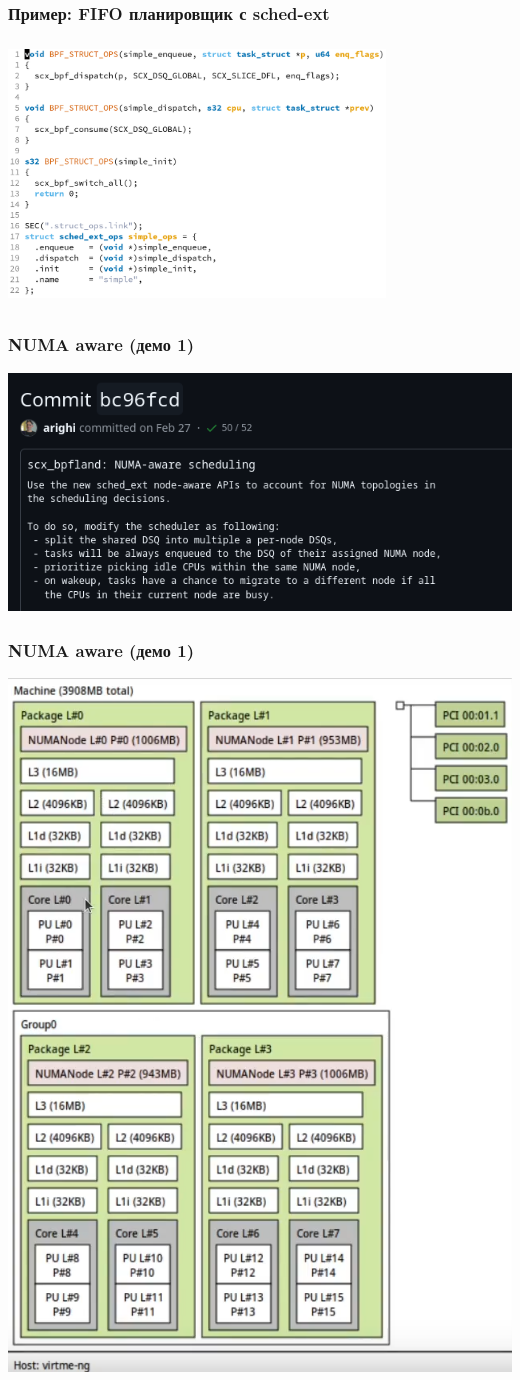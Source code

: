 \documentclass[aspectratio=169]{beamer}
\begin{document}
\begin{frame}
  \frametitle{Пример: FIFO планировщик с sched-ext}
  \includegraphics[width=10cm,height=7cm]{res/simple.png}
\end{frame}

\begin{frame}
  \frametitle{NUMA aware (демо 1)}
  \includegraphics[width=\linewidth]{res/D0_0.png}
\end{frame}

\begin{frame}
  \frametitle{NUMA aware (демо 1)}
  \vspace*{0.2cm}
  \centering
  \includegraphics[width=0.7\linewidth]{res/D0_1.png}
\end{frame}
\end{document}
